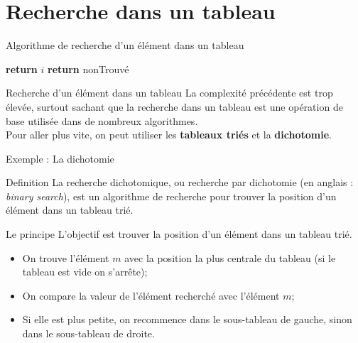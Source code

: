 \documentclass[10pt,xcolor=dvipsnames]{beamer}
\begin{document}
\section{Recherche dans un tableau}

\begin{frame}{Algorithme de recherche d'un élément dans un tableau}
    \begin{tcolorbox}
  \begin{algorithmic}[1]
        
            \State \textbf{return} $i$
        \EndIf
    \EndFor
    \State \textbf{return} nonTrouvé
    \EndFunction
  \end{algorithmic}
\end{tcolorbox}


\end{frame}

\begin{frame}{Recherche d'un élément dans un tableau}
    La complexité précédente est trop élevée, surtout sachant que la recherche dans un tableau est une opération de base utilisée dans de nombreux algorithmes.\\
    
    Pour aller plus vite, on peut utiliser les \textbf{tableaux triés} et la \textbf{dichotomie}.
\end{frame}

  
\begin{frame}{Exemple : La dichotomie}
    \begin{exampleblock}{Definition}
    La recherche dichotomique, ou recherche par dichotomie (en anglais : \textit{binary search}), est un algorithme de recherche pour trouver la position d'un élément dans un tableau trié.
    \end{exampleblock}
\begin{alertblock}{Le principe}
L'objectif est trouver la position d'un élément dans un tableau trié.
\begin{itemize}
    \item On trouve l'élément $m$ avec la position la plus centrale du tableau (si le tableau est vide on s'arrête);
    \item On compare la valeur de l'élément recherché avec l'élément $m$;
    \item Si elle est plus petite, on recommence dans le sous-tableau de gauche, sinon dans le sous-tableau de droite.
\end{itemize}
\end{alertblock}

\end{frame}
\end{document}
